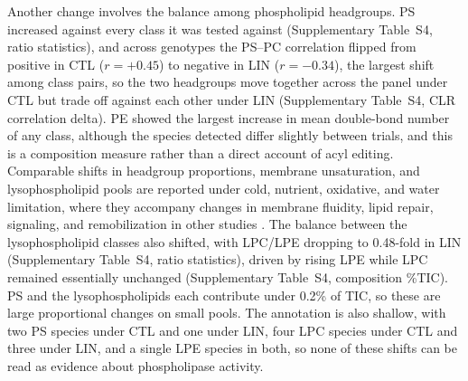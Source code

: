 \documentclass[9pt,twocolumn,twoside]{rilabRxiv}
\begin{document}
Another change involves the balance among phospholipid headgroups. PS increased against every class it was tested against (Supplementary Table~S4, ratio statistics), and across genotypes the PS--PC correlation flipped from positive in CTL ($r=+0.45$) to negative in LIN ($r=-0.34$), the largest shift among class pairs, so the two headgroups move together across the panel under CTL but trade off against each other under LIN (Supplementary Table~S4, CLR correlation delta). PE showed the largest increase in mean double-bond number of any class, although the species detected differ slightly between trials, and this is a composition measure rather than a direct account of acyl editing. Comparable shifts in headgroup proportions, membrane unsaturation, and lysophospholipid pools are reported under cold, nutrient, oxidative, and water limitation, where they accompany changes in membrane fluidity, lipid repair, signaling, and remobilization in other studies \citep{Hou2016, Rawat2021, Yan2025, Zhang2020}. The balance between the lysophospholipid classes also shifted, with LPC/LPE dropping to 0.48-fold in LIN (Supplementary Table~S4, ratio statistics), driven by rising LPE while LPC remained essentially unchanged (Supplementary Table~S4, composition \%TIC). PS and the lysophospholipids each contribute under 0.2\% of TIC, so these are large proportional changes on small pools. The annotation is also shallow, with two PS species under CTL and one under LIN, four LPC species under CTL and three under LIN, and a single LPE species in both, so none of these shifts can be read as evidence about phospholipase activity.
\end{document}
